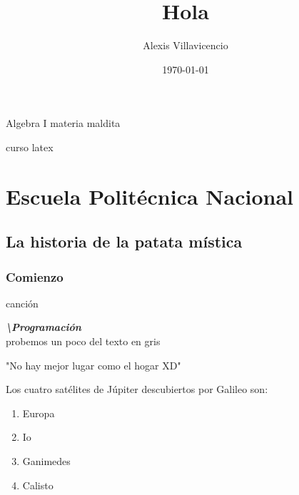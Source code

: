 \documentclass[a4paper,12pt]{article}
\author{Alexis Villavicencio}
\title{Hola}
\date{\today}
\begin{document}
 \maketitle
  
 {\Large Algebra I} {\large materia maldita}
 
 curso latex
 \section[EPN]{Escuela Politécnica Nacional}
 
 \subsection{La historia de la patata mística}
 \subsubsection{Comienzo}
 \centerline{{\LARGE canci\'{o}n}}
 
 \emph{\textbf{{\Huge \textbackslash Programación}}}
\\[5mm] {\huge\color{gray} probemos un poco del texto en gris}
 \begin{center}
 "No hay mejor lugar como el hogar XD"
 \end{center}
\noindent Los cuatro satélites de Júpiter descubiertos por Galileo son:
\begin{enumerate}
\item Europa
\item Io
\item Ganimedes
 \item Calisto
\end{enumerate}
\end{document}
